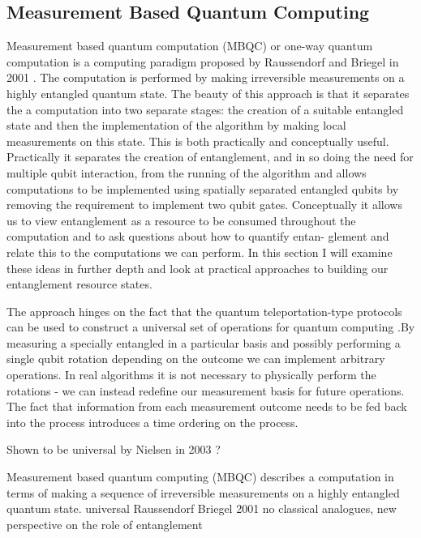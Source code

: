 \subsection{Measurement Based Quantum Computing}

Measurement based quantum computation (MBQC) \cite{mbqc_intro} or one-way quantum computation is a computing paradigm proposed by Raussendorf and Briegel in 2001 \cite{one_way_qc}. The computation is performed by making irreversible measurements on a highly entangled quantum state. The beauty of this approach is that it separates the a computation into two separate stages: the creation of a suitable entangled state and then the implementation of the algorithm by making local measurements on this state. This is both practically and conceptually useful. Practically it separates the creation of entanglement, and in so doing the need for multiple qubit interaction, from the running of the algorithm and allows computations to be implemented using spatially separated entangled qubits by removing the requirement to implement two qubit gates. Conceptually it allows us to view entanglement as a resource to be consumed throughout the computation and to ask questions about how to quantify entan- glement and relate this to the computations we can perform. In this section I will examine these ideas in further depth and look at practical approaches to building our entanglement resource states.

The approach hinges on the fact that the quantum teleportation-type protocols can be used to construct a universal set of operations for quantum computing \cite{teleportation_universal}.By measuring a specially entangled in a particular basis and possibly performing a single qubit rotation depending on the outcome we can implement arbitrary operations. In real algorithms it is not necessary to physically perform the rotations - we can instead redefine our measurement basis for future operations. The fact that information from each measurement outcome needs to be fed back into the process introduces a time ordering on the process. 

Shown to be universal by Nielsen in 2003 \cite{qc_by_measurement_03}?


Measurement based quantum computing (MBQC) describes a computation in terms of making a sequence of irreversible measurements on a highly entangled quantum state.
universal
Raussendorf Briegel 2001
\cite{qc_by_measurement_03}
\cite{mbqc_cluster_03}
no classical analogues, new perspective on the role of entanglement

